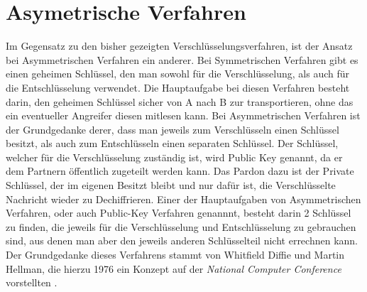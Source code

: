 \documentclass[10pt, a4paper,headsepline]{scrreprt}
\begin{document}
\section{Asymetrische Verfahren}
Im Gegensatz zu den bisher gezeigten Verschlüsselungsverfahren, ist der Ansatz bei Asymmetrischen Verfahren ein anderer. Bei Symmetrischen Verfahren gibt es einen geheimen Schlüssel, den man sowohl für die Verschlüsselung, als auch für die Entschlüsselung verwendet. Die Hauptaufgabe bei diesen Verfahren besteht darin, den geheimen Schlüssel sicher von A nach B zur transportieren, ohne das ein eventueller Angreifer diesen mitlesen kann. Bei Asymmetrischen Verfahren ist der Grundgedanke derer, dass man jeweils zum Verschlüsseln einen Schlüssel besitzt, als auch zum Entschlüsseln einen separaten Schlüssel. Der Schlüssel, welcher für die Verschlüsselung zuständig ist, wird Public Key genannt, da er dem Partnern öffentlich zugeteilt werden kann. Das Pardon dazu ist der Private Schlüssel, der im eigenen Besitzt bleibt und nur dafür ist, die Verschlüsselte Nachricht wieder zu Dechiffrieren. Einer der Hauptaufgaben von Asymmetrischen Verfahren, oder auch Public-Key Verfahren genannnt, besteht darin 2 Schlüssel zu finden, die jeweils für die Verschlüsselung und Entschlüsselung zu gebrauchen sind, aus denen man aber den jeweils anderen Schlüsselteil nicht errechnen kann. Der Grundgedanke dieses Verfahrens stammt von Whitfield Diffie und Martin Hellman, die hierzu 1976 ein Konzept auf der \textit{National Computer Conference} vorstellten \citep[S. 525]{book:angewandte-krypto}.
\end{document}
